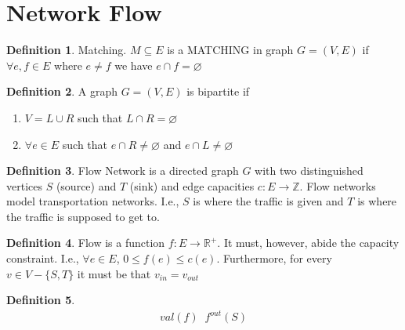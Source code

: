 \documentclass[a4paper]{article}
\theoremstyle{plain}
\newcommand*{\MyDef}{\mathrm{def}}
\newcommand*{\eqdef}{\ensuremath{\mathop{\overset{\MyDef}{=}}}}
\theoremstyle{definition}
\newtheorem{defn}{Definition}[section]
\theoremstyle{remark}
\begin{document}
	\section{Network Flow}
	\begin{defn}
		Matching. $M \subseteq E$ is a MATCHING in graph $G=(V,E)$ if $\forall e,f \in E$ where $e \neq f$ we have $e \cap f = \varnothing$
	\end{defn}
	\begin{defn}
		A graph $G=(V,E)$ is bipartite if
		\begin{enumerate}
			\item $V = L \cup R$ such that $L \cap R = \varnothing$
			\item $\forall e \in E$ such that $e \cap R \neq \varnothing$ and $e \cap L \neq \varnothing$
		\end{enumerate}
	\end{defn}
	\begin{defn}
		Flow Network is a directed graph $G$ with two distinguished vertices $S$ (source) and $T$ (sink) and edge capacities $c : E \to \mathbb{Z}$. Flow networks model transportation networks. I.e., $S$ is where the traffic is given and $T$ is where the traffic is supposed to get to.
	\end{defn}
	\begin{defn}
		Flow is a function $f : E \to \mathbb{R}^{+}$. It must, however, abide the capacity constraint. I.e., $\forall  e \in E$, $0 \le f(e) \le c(e)$. Furthermore, for every $ v \in V - \{S,T\}$ it must be that $v_{in}=v_{out}$
	\end{defn}
	\begin{defn}
		\begin{align*}
			val(f) \eqdef f^{out}(S)
		\end{align*}
	\end{defn}
\end{document}
